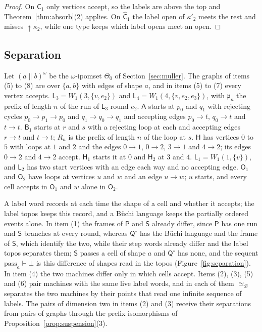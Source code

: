 \documentclass{lmcs}
\theoremstyle{definition}
\theoremstyle{remark}
\newcommand{\ab}{\{a,b\}}
\newcommand{\upc}[1]{{\uparrow}#1}
\providecommand{\KA}{\mathsf{A}}
\providecommand{\KB}[1]{\mathsf{B}_{#1}}
\providecommand{\wQ}{\mathsf{Q}}
\providecommand{\eqB}{\simeq_{\mathcal{B}}}
\providecommand{\Wq}[3]{W_{#1}(#2,#3)}
\providecommand{\wQ}{\mathsf{Q}}
\providecommand{\wC}[1]{\mathsf{C}_{#1}}
\providecommand{\wCh}[1]{\hat{\mathsf{C}}_{#1}}
\begin{document}
\begin{proof}
On $\wC{1}$ only vertices accept, so the labels are above the top and Theorem~\ref{thm:absorb}(2)
applies. On $\wCh{1}$ the label open of $\kappa'_2$ meets the rest and misses
$\upc{\kappa_2}$, while one type keeps which label opens meet an
open.
\end{proof}

\subsection{Separation}\label{ssec:decide-sep}\label{ssec:image-separation}

Let $(a\parallel b)^\omega$ be the $\omega$-ipomset $\Theta_0$ of Section~\ref{sec:muller}. The graphs
of items (5) to (8) are over $\ab$ with edges of shape $a$, and in items (5) to (7) every vertex accepts.
$\mathsf{L}_3=\Wq{1}{3}{\{v,e_2\}}$ and $\mathsf{L}_4=\Wq{1}{4}{\{v,e_2,e_3\}}$, with $\mathfrak p_n$ the prefix of length $n$ of
the run of $\mathsf{L}_3$ round $e_2$. $\KA$ starts at $p_0$ and $q_1$
with rejecting cycles $p_0\to p_1\to p_0$ and $q_1\to q_0\to q_1$ and accepting edges $p_0\to t$, $q_0\to t$ and $t\to t$.
$\KB{1}$ starts at $r$ and $s$ with a rejecting loop at each and accepting edges $r\to t$ and $t\to t$; $R_n$ is
the prefix of length $n$ of the loop at $s$. $\mathsf{H}$ has
vertices $0$ to $5$ with loops at $1$ and $2$ and the edges $0\to1$, $0\to2$, $3\to1$ and $4\to2$; its edges $0\to2$
and $4\to2$ accept. $\mathsf{H}_1$ starts it at $0$ and $\mathsf{H}_2$ at $3$ and
$4$. $\mathsf{L}_1=\Wq{1}{1}{\{v\}}$, and
$\mathsf{L}_2$ has two start vertices with an edge each way and no accepting edge.
$\mathsf O_1$ and $\mathsf O_2$ have loops at vertices $u$ and $w$ and an edge $u\to w$; $u$ starts, and every cell
accepts in $\mathsf O_1$ and $w$ alone in $\mathsf O_2$.

A label word records at each time the shape of a cell and whether it accepts; the label topos keeps this record,
and a B\"uchi language keeps the partially ordered events alone. In item (1) the frames of $\mathsf P$ and $\mathsf S$
already differ, since $\mathsf P$ has one run and $\mathsf S$ branches at every round, whereas $\wQ^\circ$ has the B\"uchi language and the frame of $\mathsf S$, which identify the two, while their step
words already differ and the label topos separates them; $\mathsf S$ passes a cell of shape $a$
and $\wQ^\circ$ has none, and the sequent $\mathrm{pass}_a\vdash\bot$ is this difference of shapes read in the topos (Figure~\ref{fig:separation}). In item (4) the two
machines differ only in which cells accept. Items (2), (3), (5) and (6) pair machines with the same live label
words, and in each of them $\eqB$ separates the two machines by their points that read one infinite sequence of labels. The pairs of dimension two in items (2) and
(3) receive their separations from pairs of graphs through the prefix isomorphisms of
Proposition~\ref{prop:suspension}(3).
\end{document}
